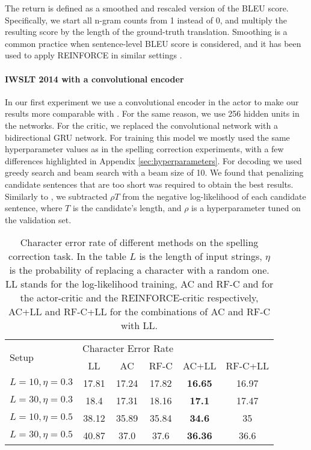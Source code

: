 \documentclass{article} \usepackage{iclr2017_conference,times}
\begin{document}
The return is defined as a smoothed and rescaled version of the BLEU score. Specifically,
we start all n-gram counts from 1 instead of 0, and multiply the resulting score
by the length of the ground-truth translation. Smoothing is a common practice when sentence-level
BLEU score is considered, and it has been used to apply REINFORCE in similar settings
\citep{ranzato2015sequence}.

\paragraph{IWSLT 2014 with a convolutional encoder}

In our first experiment we use a convolutional encoder in the actor to make our results more comparable with \citet{ranzato2015sequence}.
For the same reason, we use 256 hidden units in the  networks.
For the critic, we replaced the convolutional network with a bidirectional GRU network.
For training this model we mostly used the same hyperparameter values as in the spelling 
correction experiments, with a few differences highlighted in Appendix \ref{sec:hyperparameters}.
For decoding we used greedy search and beam search with a beam size of 10. We
found that penalizing
 candidate sentences that are too short was required to
obtain the best results. Similarly to \citep{hannun2014first},
 we subtracted
$\rho T$ from the negative log-likelihood of each candidate
 sentence, where
$T$ is the candidate's length, and $\rho$ is a hyperparameter
 tuned on the
validation set.


\begin{table}\centering
    \caption{Character error rate of different methods on the spelling correction task.
        In the table $L$ is the length of input strings, $\eta$ 
        is the probability of replacing a character with a random one.
        LL stands for the log-likelihood training, AC and RF-C and for the actor-critic and the
        REINFORCE-critic respectively, AC+LL and RF-C+LL for the combinations of AC and RF-C with LL.}
    \begin{tabular}{l | c | c | c | c | c}
        \multirow{2}{*}{Setup} & \multicolumn{3}{|c}{Character Error Rate} \\
                               & LL & AC & RF-C & AC+LL & RF-C+LL \\
        \hline\hline
        $L=10, \eta=0.3$  & 17.81 & 17.24 & 17.82 & \textbf{16.65} & 16.97 \\
        $L=30, \eta=0.3$  & 18.4  & 17.31 & 18.16 & \textbf{17.1} & 17.47 \\
        $L=10, \eta=0.5$  & 38.12 & 35.89 & 35.84 & \textbf{34.6} & 35 \\
        $L=30, \eta=0.5$  & 40.87 & 37.0 & 37.6 & \textbf{36.36} & 36.6 
    \end{tabular}
    \label{tab:spelling}
\end{table}
\end{document}

